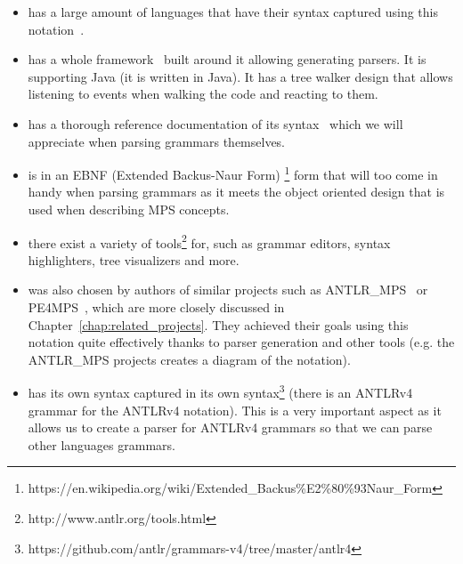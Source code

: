 \begin{itemize}
	\item has a large amount of languages that have their syntax captured using this notation~\cite{ANTLR4grammars}.

	\item has a whole framework~\cite{ANTLR4} built around it allowing generating parsers.
	It is supporting Java (it is written in Java).
	It has a tree walker design that allows listening to events when walking the code and reacting to them.

	\item has a thorough reference documentation of its syntax~\cite{ANTLR4reference} which we will appreciate when parsing grammars themselves.

	\item is in an EBNF (Extended Backus-Naur Form) \footnote{https://en.wikipedia.org/wiki/Extended{\_}Backus\%E2\%80\%93Naur{\_}Form} form that will too come in handy when parsing grammars as it meets the object oriented design that is used when describing MPS concepts.

	\item there exist a variety of tools\footnote{http://www.antlr.org/tools.html} for, such as grammar editors, syntax highlighters, tree visualizers and more.

	\item was also chosen by authors of similar projects such as ANTLR{\_}MPS~\cite{ANTLR2MPS} or PE4MPS~\cite{PE4MPS}, which are more closely discussed in Chapter~\ref{chap:related_projects}.
	They achieved their goals using this notation quite effectively thanks to parser generation and other tools (e.g. the ANTLR{\_}MPS projects creates a diagram of the notation).

	\item has its own syntax captured in its own syntax\footnote{https://github.com/antlr/grammars-v4/tree/master/antlr4} (there is an ANTLRv4 grammar for the ANTLRv4 notation).
	This is a very important aspect as it allows us to create a parser for ANTLRv4 grammars so that we can parse other languages grammars.
\end{itemize}
